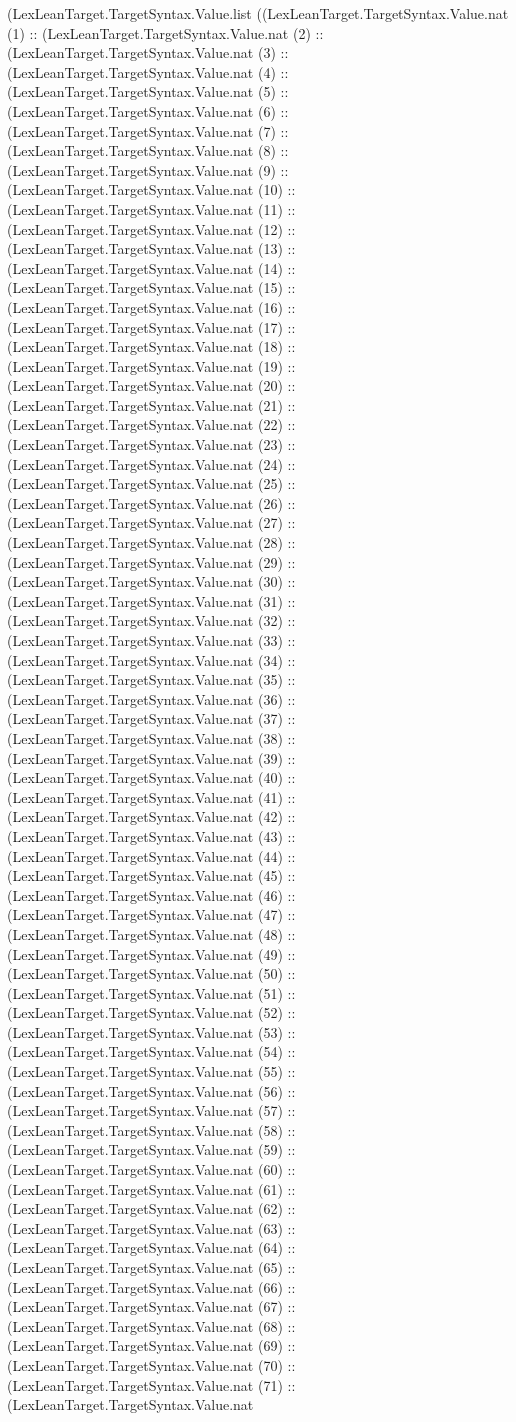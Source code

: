 \documentclass[11pt]{article}
\begin{document}
(LexLeanTarget.TargetSyntax.Value.list ((LexLeanTarget.TargetSyntax.Value.nat (1) :: (LexLeanTarget.TargetSyntax.Value.nat (2) :: (LexLeanTarget.TargetSyntax.Value.nat (3) :: (LexLeanTarget.TargetSyntax.Value.nat (4) :: (LexLeanTarget.TargetSyntax.Value.nat (5) :: (LexLeanTarget.TargetSyntax.Value.nat (6) :: (LexLeanTarget.TargetSyntax.Value.nat (7) :: (LexLeanTarget.TargetSyntax.Value.nat (8) :: (LexLeanTarget.TargetSyntax.Value.nat (9) :: (LexLeanTarget.TargetSyntax.Value.nat (10) :: (LexLeanTarget.TargetSyntax.Value.nat (11) :: (LexLeanTarget.TargetSyntax.Value.nat (12) :: (LexLeanTarget.TargetSyntax.Value.nat (13) :: (LexLeanTarget.TargetSyntax.Value.nat (14) :: (LexLeanTarget.TargetSyntax.Value.nat (15) :: (LexLeanTarget.TargetSyntax.Value.nat (16) :: (LexLeanTarget.TargetSyntax.Value.nat (17) :: (LexLeanTarget.TargetSyntax.Value.nat (18) :: (LexLeanTarget.TargetSyntax.Value.nat (19) :: (LexLeanTarget.TargetSyntax.Value.nat (20) :: (LexLeanTarget.TargetSyntax.Value.nat (21) :: (LexLeanTarget.TargetSyntax.Value.nat (22) :: (LexLeanTarget.TargetSyntax.Value.nat (23) :: (LexLeanTarget.TargetSyntax.Value.nat (24) :: (LexLeanTarget.TargetSyntax.Value.nat (25) :: (LexLeanTarget.TargetSyntax.Value.nat (26) :: (LexLeanTarget.TargetSyntax.Value.nat (27) :: (LexLeanTarget.TargetSyntax.Value.nat (28) :: (LexLeanTarget.TargetSyntax.Value.nat (29) :: (LexLeanTarget.TargetSyntax.Value.nat (30) :: (LexLeanTarget.TargetSyntax.Value.nat (31) :: (LexLeanTarget.TargetSyntax.Value.nat (32) :: (LexLeanTarget.TargetSyntax.Value.nat (33) :: (LexLeanTarget.TargetSyntax.Value.nat (34) :: (LexLeanTarget.TargetSyntax.Value.nat (35) :: (LexLeanTarget.TargetSyntax.Value.nat (36) :: (LexLeanTarget.TargetSyntax.Value.nat (37) :: (LexLeanTarget.TargetSyntax.Value.nat (38) :: (LexLeanTarget.TargetSyntax.Value.nat (39) :: (LexLeanTarget.TargetSyntax.Value.nat (40) :: (LexLeanTarget.TargetSyntax.Value.nat (41) :: (LexLeanTarget.TargetSyntax.Value.nat (42) :: (LexLeanTarget.TargetSyntax.Value.nat (43) :: (LexLeanTarget.TargetSyntax.Value.nat (44) :: (LexLeanTarget.TargetSyntax.Value.nat (45) :: (LexLeanTarget.TargetSyntax.Value.nat (46) :: (LexLeanTarget.TargetSyntax.Value.nat (47) :: (LexLeanTarget.TargetSyntax.Value.nat (48) :: (LexLeanTarget.TargetSyntax.Value.nat (49) :: (LexLeanTarget.TargetSyntax.Value.nat (50) :: (LexLeanTarget.TargetSyntax.Value.nat (51) :: (LexLeanTarget.TargetSyntax.Value.nat (52) :: (LexLeanTarget.TargetSyntax.Value.nat (53) :: (LexLeanTarget.TargetSyntax.Value.nat (54) :: (LexLeanTarget.TargetSyntax.Value.nat (55) :: (LexLeanTarget.TargetSyntax.Value.nat (56) :: (LexLeanTarget.TargetSyntax.Value.nat (57) :: (LexLeanTarget.TargetSyntax.Value.nat (58) :: (LexLeanTarget.TargetSyntax.Value.nat (59) :: (LexLeanTarget.TargetSyntax.Value.nat (60) :: (LexLeanTarget.TargetSyntax.Value.nat (61) :: (LexLeanTarget.TargetSyntax.Value.nat (62) :: (LexLeanTarget.TargetSyntax.Value.nat (63) :: (LexLeanTarget.TargetSyntax.Value.nat (64) :: (LexLeanTarget.TargetSyntax.Value.nat (65) :: (LexLeanTarget.TargetSyntax.Value.nat (66) :: (LexLeanTarget.TargetSyntax.Value.nat (67) :: (LexLeanTarget.TargetSyntax.Value.nat (68) :: (LexLeanTarget.TargetSyntax.Value.nat (69) :: (LexLeanTarget.TargetSyntax.Value.nat (70) :: (LexLeanTarget.TargetSyntax.Value.nat (71) :: (LexLeanTarget.TargetSyntax.Value.nat 
\end{document}
